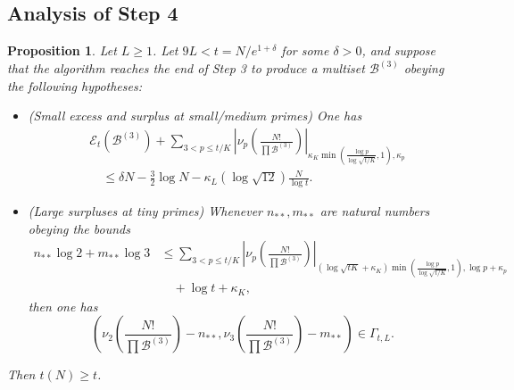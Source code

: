 \documentclass[12pt,a4paper,reqno]{amsart}
\numberwithin{equation}{section}
\theoremstyle{plain}
\newtheorem{proposition}[theorem]{Proposition}
\theoremstyle{definition}
\newcommand\tuple{{\mathcal B}}
\newcommand\excess{{\mathcal{E}}}
\begin{document}
\subsection{Analysis of Step 4}

\begin{proposition}\label{step4-reduce}  Let $L \geq 1$.  Let $9L < t = N/e^{1+\delta}$ for some $\delta>0$, and suppose that the algorithm reaches the end of Step 3 to produce a multiset $\tuple^{(3)}$ obeying the following hypotheses:
  \begin{itemize}
  \item[(i)] (Small excess and surplus at small/medium primes) One has
\begin{equation}\label{new-balance-5}
    \begin{split}
&      \excess_t(\tuple^{(3)}) + \sum_{3 < p \leq t/K}
   \left|\nu_p\left(\frac{N!}{\prod \tuple^{(3)}}\right)\right|_{\kappa_K \min(\frac{\log p}{\log\sqrt{t/K}},1),\kappa_p}\\
&\quad    \leq \delta N - \frac{3}{2} \log N - \kappa_L (\log \sqrt{12}) \frac{N}{\log t}.
    \end{split}
  \end{equation}
  \item[(ii)] (Large surpluses at tiny primes) 
  Whenever $n_{**}, m_{**}$ are natural numbers obeying the bounds
  \begin{equation}\label{nstarb}
    \begin{split}
   n_{**} \log 2 + m_{**} \log 3 &\leq 
    \sum_{3 < p \leq t/K}
    \left|\nu_p\left(\frac{N!}{\prod \tuple^{(3)}}\right)\right|_{(\log \sqrt{tK} + \kappa_K) \min(\frac{\log p}{\log\sqrt{t/K}},1),\log p+\kappa_p}\\
  &\quad  + \log t + \kappa_K,
  \end{split}
\end{equation}
    then one has
  \begin{equation}\label{sector}\left( \nu_2\left(\frac{N!}{\prod \tuple^{(3)}}\right) - n_{**}, \nu_3\left(\frac{N!}{\prod \tuple^{(3)}}\right) - m_{**}\right) \in \Gamma_{t,L}.
  \end{equation}
  \end{itemize}
     Then $t(N) \geq t$.
\end{proposition}
\end{document}
